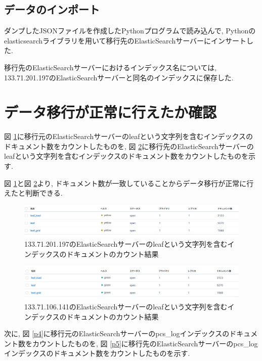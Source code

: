\documentclass[a4j,12pt,]{jarticle}
\begin{document}
\subsection{データのインポート}
ダンプしたJSONファイルを作成したPythonプログラムで読み込んで, Pythonのelasticsearchライブラリを用いて移行先のElasticSearchサーバーにインサートした.

移行先のElasticSearchサーバーにおけるインデックス名については, 133.71.201.197のElasticSearchサーバーと同名のインデックスに保存した.

\section{データ移行が正常に行えたか確認}
図 \ref{p2}に移行元のElasticSearchサーバーのleafという文字列を含むインデックスのドキュメント数をカウントしたものを, 図 \ref{p3}に移行先のElasticSearchサーバーのleafという文字列を含むインデックスのドキュメント数をカウントしたものを示す.

図 \ref{p2}と図 \ref{p3}より, ドキュメント数が一致していることからデータ移行が正常に行えたと判断できる.

\begin{figure}[H]
  \begin{center}
    \includegraphics[width=160mm]{197leaf.png}
    \caption{133.71.201.197のElasticSearchサーバーのleafという文字列を含むインデックスのドキュメントのカウント結果}
    \label{p2}
  \end{center}
\end{figure}

\begin{figure}[H]
  \begin{center}
    \includegraphics[width=160mm]{141leaf.png}
    \caption{133.71.106.141のElasticSearchサーバーのleafという文字列を含むインデックスのドキュメントのカウント結果}
    \label{p3}
  \end{center}
\end{figure}

次に, 図 \ref{p4}に移行元のElasticSearchサーバーのpcs\_logインデックスのドキュメント数をカウントしたものを, 図 \ref{p5}に移行先のElasticSearchサーバーのpcs\_logインデックスのドキュメント数をカウントしたものを示す.
\end{document}
